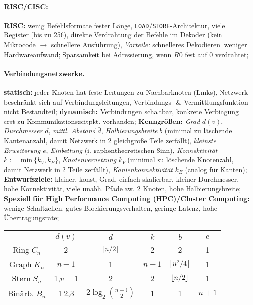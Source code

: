 \documentclass[8pt,a4paper]{article}
\begin{document}
\begin{multicols}{2}
\paragraph{RISC/CISC:} \textbf{RISC:} wenig Befehlsformate fester
Länge, \texttt{LOAD}/\texttt{STORE}-Architektur,
viele Register (bis zu 256), direkte Verdrahtung der Befehle im
Dekoder (kein Mikrocode $\rightarrow$ schnellere Ausführung),
\emph{Vorteile:} schnelleres Dekodieren; weniger Hardwareaufwand;
Sparsamkeit bei Adressierung, wenn $R0$ fest auf $0$ verdrahtet;

\paragraph{Verbindungsnetzwerke.} \textbf{statisch:} jeder Knoten hat
feste Leitungen zu Nachbarknoten (Links), Netzwerk beschränkt sich auf
Verbindungsleitungen, Verbindungs- \& Vermittlungsfunktion nicht
Bestandteil; \textbf{dynamisch:} Verbindungen schaltbar, konkrete
Verbingung erst zu Kommunikationszeitpkt. vorhanden;
\textbf{Kenngrößen:} \emph{Grad} $d(v)$, \emph{Durchmesser} $d$, \emph{mittl. Abstand} $\bar{d}$, \emph{Halbierungsbreite} $b$ (minimal zu läschende Kantenanzahl, damit Netzwerk in 2 gleichgroße Teile zerfällt), \emph{kleinste Erweiterung} $e$, \emph{Einbettung} (i. gaphentheoretischen Sinn), \emph{Konnektivität} $k:=\min\{k_V,k_E\}$, \emph{Knotenvernetzung} $k_V$ (minimal zu löschende Knotenzahl, damit Netzwerk in 2 Teile zerfällt), \emph{Kantenkonnektivität} $k_E$ (analog für Kanten);
\textbf{Entwurfsziele:} kleiner, konst, Grad, einfach skalierbar, kleiner Durchmesser, hohe Konnektivität, viele unabh. Pfade zw. 2 Knoten, hohe Halbierungsbreite; \textbf{Speziell für High Performance Computing (HPC)/Cluster Computing:} wenige Schaltzellen, gutes Blockierungsverhalten, geringe Latenz, hohe Übertragungsrate;\\
\begin{tabular}{c|ccccc}
                     & $d(v)$        & $d$                      & $k$         & $b$               & $e$   \\ \hline
Ring $C_n$           & 2             & $\left\lfloor n/2\right\rfloor$            & 2           & 2                 & 1     \\
Graph $K_n$          & $n-1$         & 1                        & $n-1$       & $\left\lfloor n^2/4\right\rfloor$   & 1     \\
Stern $S_n$          & 1,$n-1$       & 2                        & 2           & $\left\lfloor n/2\right\rfloor$     & 1     \\
Binärb. $B_n$        & 1,2,3         & $2\log_2(\frac{n+1}{2})$ & 1           & 1                 & $n+1$ \\

\end{tabular}
\end{multicols}
\end{document}
